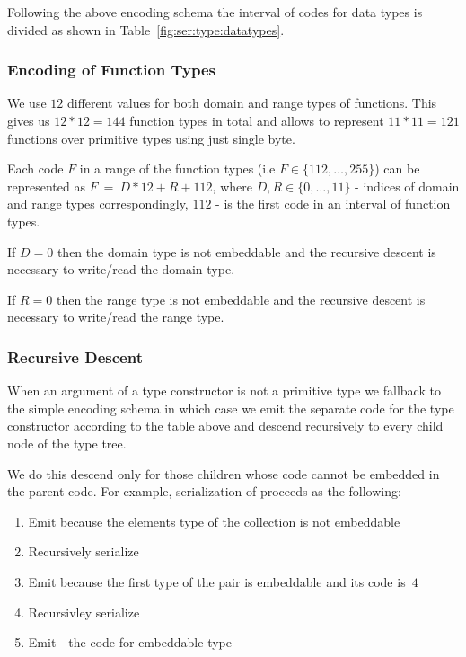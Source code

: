 Following the above encoding schema the interval of codes for data types is divided as
shown in Table~\ref{fig:ser:type:datatypes}.


\subsubsection{Encoding of Function Types}

We use $12$ different values for both domain and range types of functions. This
gives us $12 * 12 = 144$ function types in total and allows to represent $11 *
11 = 121$ functions over primitive types using just single byte.

Each code $F$ in a range of the function types (i.e $F \in \{112, \dots, 255\}$) can be
represented as $F~=~D * 12 + R + 112$, where $D, R \in \{0,\dots,11\}$ - indices of
domain and range types correspondingly, $112$ - is the first code in an interval of
function types.

If $D = 0$ then the domain type is not embeddable and the recursive descent is
necessary to write/read the domain type.

If $R = 0$ then the range type is not embeddable and the recursive descent is necessary
to write/read the range type.

\subsubsection{Recursive Descent}
\label{sec:ser:type:recursive}

When an argument of a type constructor is not a primitive type we fallback to the
simple encoding schema in which case we emit the separate code for the type constructor
according to the table above and descend recursively to every child node of the type
tree.

We do this descend only for those children whose code cannot be embedded in
the parent code. For example, serialization of 
proceeds as the following:
\begin{enumerate}
\item Emit  because the elements type of the collection is not embeddable 
\item Recursively serialize 
\item Emit  because the first type of the pair is embeddable and its code is~$4$
\item Recursivley serialize 
\item Emit  - the code for embeddable type 
\end{enumerate}

